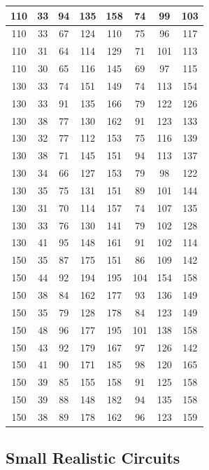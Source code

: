 \begin{longtable}[c]{|c|c|c|c|c|c|c|c|}
110 & 33 & 94 & 135 & 158 & 74  & 99  & 103 \\ \hline
110 & 33 & 67 & 124 & 110 & 75  & 96  & 117 \\ \hline
110 & 31 & 64 & 114 & 129 & 71  & 101 & 113 \\ \hline
110 & 30 & 65 & 116 & 145 & 69  & 97  & 115 \\ \hline
130 & 33 & 74 & 151 & 149 & 74  & 113 & 154 \\ \hline
130 & 33 & 91 & 135 & 166 & 79  & 122 & 126 \\ \hline
130 & 38 & 77 & 130 & 162 & 91  & 123 & 133 \\ \hline
130 & 32 & 77 & 112 & 153 & 75  & 116 & 139 \\ \hline
130 & 38 & 71 & 145 & 151 & 94  & 113 & 137 \\ \hline
130 & 34 & 66 & 127 & 153 & 79  & 98  & 122 \\ \hline
130 & 35 & 75 & 131 & 151 & 89  & 101 & 144 \\ \hline
130 & 31 & 70 & 114 & 157 & 74  & 107 & 135 \\ \hline
130 & 33 & 76 & 130 & 141 & 79  & 102 & 128 \\ \hline
130 & 41 & 95 & 148 & 161 & 91  & 102 & 114 \\ \hline
150 & 35 & 87 & 175 & 151 & 86  & 109 & 142 \\ \hline
150 & 44 & 92 & 194 & 195 & 104 & 154 & 158 \\ \hline
150 & 38 & 84 & 162 & 177 & 93  & 136 & 149 \\ \hline
150 & 35 & 79 & 128 & 178 & 84  & 123 & 149 \\ \hline
150 & 48 & 96 & 177 & 195 & 101 & 138 & 158 \\ \hline
150 & 43 & 92 & 179 & 167 & 97  & 126 & 142 \\ \hline
150 & 41 & 90 & 171 & 185 & 98  & 120 & 165 \\ \hline
150 & 39 & 85 & 155 & 158 & 91  & 125 & 158 \\ \hline
150 & 39 & 88 & 148 & 182 & 94  & 135 & 158 \\ \hline
150 & 38 & 89 & 178 & 162 & 96  & 123 & 159 \\ \hline
\end{longtable}

\subsection{Small Realistic Circuits}

